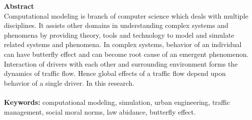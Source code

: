 
{\LARGE\textbf {Abstract}} \\ %
Computational modeling is branch of computer science which deals with multiple disciplines. It assists other domains in understanding complex systems and phenomena by providing theory, tools and technology to model and simulate related systems and phenomena. In complex systems, behavior of an individual can have butterfly effect and can become root cause of an emergent phenomenon. Interaction of drivers with each other and surrounding environment forms the dynamics of traffic flow. Hence global effects of a traffic flow depend upon behavior of a single driver. In this research. \\ \\
\textbf{Keywords:}
computational modeling, simulation, urban engineering, traffic management, social moral norms, law abidance, butterfly effect.


